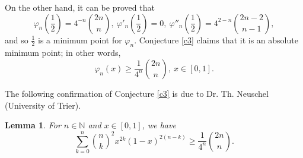 \documentclass[12pt,leqno,a4paper,dvips,twoside]{article}
\newcommand*{\N}{\ensuremath{\mathbb{N}}}               %
\newtheorem{lema}[thm]{Lemma}%
\begin{document}
{On the other hand, it can be proved that
	\begin{equation*}
		\varphi_n\left(\frac{1}{2}\right)=4^{-n}\binom{2n}{n},\ \varphi'_n\left(\frac{1}{2}\right)=0,\ \varphi''_n\left(\frac{1}{2}\right)=4^{2-n}\binom{2n-2}{n-1},
	\end{equation*}
and so $\frac{1}{2}$ is a minimum point for $\varphi_n$. Conjecture \ref{c3} claims that it is an absolute minimum point; in other words,
	\begin{equation}\label{eq3}
		\varphi_n(x)\geq \frac{1}{4^n}\binom{2n}{n}, \ x\in [0,1].
	\end{equation}

The following confirmation of Conjecture \ref{c3} is due to Dr. Th. Neuschel (University of Trier). 

\begin{lema}\label{lc3}
	For $n\in\N$ and $x\in [0,1]$, we have
		\begin{equation*}
			\sum^{n}_{k=0}{\binom{n}{k}}^2x^{2k}(1-x)^{2(n-k)}\geq \frac{1}{4^n}\binom{2n}{n}.
		\end{equation*}
\end{lema}

}
\end{document}
